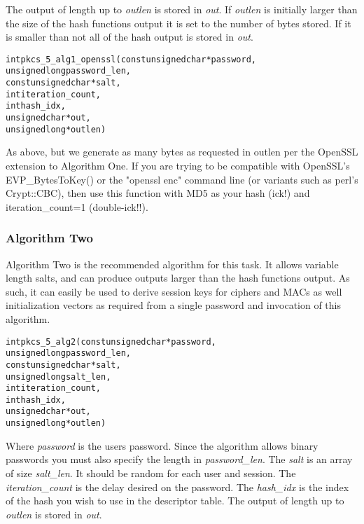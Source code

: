 \documentclass[synpaper]{book}
\begin{document}
The output of length up to \textit{outlen} is stored in \textit{out}.  If \textit{outlen} is initially larger than the size of the hash functions output
it is set to the number of bytes stored.  If it is smaller than not all of the hash output is stored in \textit{out}.

\begin{alltt}
int pkcs_5_alg1_openssl(const unsigned char *password,
                      unsigned long  password_len,
                const unsigned char *salt,
                                int  iteration_count,
                                int  hash_idx,
                      unsigned char *out,
                      unsigned long *outlen)
\end{alltt}
As above, but we generate as many bytes as requested in outlen per the OpenSSL extension to Algorithm One.  If you are trying to be compatible with OpenSSL's EVP\_BytesToKey() or the "openssl enc" command line (or variants such as perl's Crypt::CBC), then use this function with MD5 as your hash (ick!) and iteration\_count=1 (double-ick!!).
\subsubsection{Algorithm Two}

Algorithm Two is the recommended algorithm for this task.  It allows variable length salts, and can produce outputs larger than the
hash functions output.  As such, it can easily be used to derive session keys for ciphers and MACs as well initialization vectors as required
from a single password and invocation of this algorithm.

\begin{alltt}
int pkcs_5_alg2(const unsigned char *password,
                      unsigned long  password_len,
                const unsigned char *salt,
                      unsigned long  salt_len,
                                int  iteration_count,
                                int  hash_idx,
                      unsigned char *out,
                      unsigned long *outlen)
\end{alltt}
Where \textit{password} is the users password.  Since the algorithm allows binary passwords you must also specify the length in \textit{password\_len}.
The \textit{salt} is an array of size \textit{salt\_len}.  It should be random for each user and session.  The \textit{iteration\_count} is the delay desired
on the password.  The \textit{hash\_idx} is the index of the hash you wish to use in the descriptor table.   The output of length up to
\textit{outlen} is stored in \textit{out}.
\end{document}
